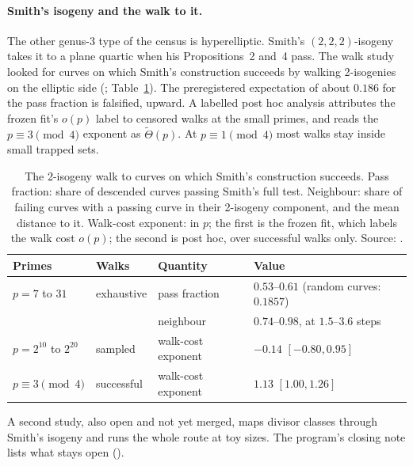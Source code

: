 \paragraph{Smith's isogeny and the walk to it.} The other genus-3 type of the
census is hyperelliptic. Smith's $(2,2,2)$-isogeny takes it to a plane quartic
when his Propositions~2 and~4 pass. The walk study looked for curves on which
Smith's construction succeeds by walking 2-isogenies on the elliptic side
(; Table~\ref{tab:prog_transfer-smith}).
The preregistered expectation of about $0.186$ for the pass fraction is
falsified, upward. A labelled post hoc analysis attributes the frozen fit's
$o(p)$ label to censored walks at the small primes, and reads the
$p\equiv3\pmod4$ exponent as $\tilde\Theta(p)$. At $p\equiv1\pmod4$ most
walks stay inside small trapped sets.

\begin{table}[t]
\centering\small
\begin{tabular}{@{}llll@{}}
\toprule
Primes & Walks & Quantity & Value \\
\midrule
$p=7$ to $31$ & exhaustive & pass fraction & $0.53$--$0.61$ (random curves: $0.1857$) \\
 & & neighbour & $0.74$--$0.98$, at $1.5$--$3.6$ steps \\
\addlinespace
$p=2^{10}$ to $2^{20}$ & sampled & walk-cost exponent & $-0.14$ $[-0.80,0.95]$ \\
$p\equiv3\pmod4$ & successful & walk-cost exponent & $1.13$ $[1.00,1.26]$ \\
\bottomrule
\end{tabular}
\caption[]{The 2-isogeny walk to curves on which Smith's construction
succeeds. Pass fraction: share of descended curves passing Smith's full
test. Neighbour: share of failing curves with a passing curve in their
2-isogeny component, and the mean distance to it. Walk-cost exponent: in
$p$; the first is the frozen fit, which labels the walk cost $o(p)$; the
second is post hoc, over successful walks only. Source:
.}
\label{tab:prog_transfer-smith}
\end{table}
A second study, also open and not yet merged, maps divisor classes through
Smith's isogeny and runs the whole route at toy sizes. The program's closing
note lists what stays open ().

